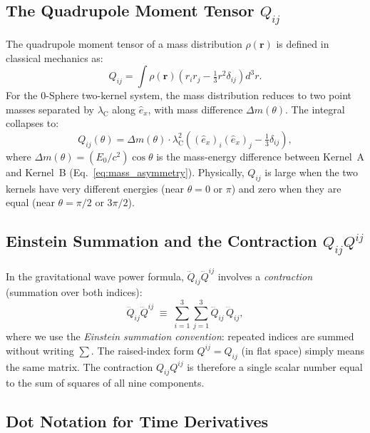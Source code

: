 \documentclass[%
 reprint, amsmath,amssymb, aps, prb, ]{revtex4-2}
\numberwithin{equation}{section}
\newcommand{\iphase}{\theta}
\newcommand{\lambdaC}{\lambda_{\mathrm{C}}}
\newcommand{\ehat}[1]{\hat{e}_{#1}}
\begin{document}
\subsection{The Quadrupole Moment Tensor $Q_{ij}$}

The quadrupole moment tensor of a mass distribution $\rho(\mathbf{r})$ is defined in classical mechanics as:
\begin{equation}
Q_{ij} = \int \rho(\mathbf{r})\left(r_i r_j - \tfrac{1}{3}r^2\delta_{ij}\right) d^3r.
\end{equation}
For the 0-Sphere two-kernel system, the mass distribution reduces to two point masses separated by $\lambdaC$ along $\ehat{x}$, with mass difference $\Delta m(\iphase)$.
The integral collapses to:
\begin{equation}
Q_{ij}(\iphase) = \Delta m(\iphase)\cdot\lambdaC^2
\left((\ehat{x})_i(\ehat{x})_j - \tfrac{1}{3}\delta_{ij}\right),
\end{equation}
where $\Delta m(\iphase) = (E_0/c^2)\cos\iphase$ is the mass-energy difference between Kernel~A and Kernel~B (Eq.~\eqref{eq:mass_asymmetry}).
Physically, $Q_{ij}$ is large when the two kernels have very different energies (near $\iphase = 0$ or $\pi$) and zero when they are equal (near $\iphase = \pi/2$ or $3\pi/2$).

\subsection{Einstein Summation and the Contraction $Q_{ij}Q^{ij}$}

In the gravitational wave power formula, $\dddot{Q}_{ij}\dddot{Q}^{ij}$ involves a \emph{contraction} (summation over both indices):
\begin{equation}
\dddot{Q}_{ij}\dddot{Q}^{ij} \;\equiv\; \sum_{i=1}^{3}\sum_{j=1}^{3} \dddot{Q}_{ij}\,\dddot{Q}_{ij},
\end{equation}
where we use the \emph{Einstein summation convention}: repeated indices are summed without writing $\sum$.
The raised-index form $Q^{ij} = Q_{ij}$ (in flat space) simply means the same matrix.
The contraction $Q_{ij}Q^{ij}$ is therefore a single scalar number equal to the sum of squares of all nine components.

\subsection{Dot Notation for Time Derivatives}
\end{document}
